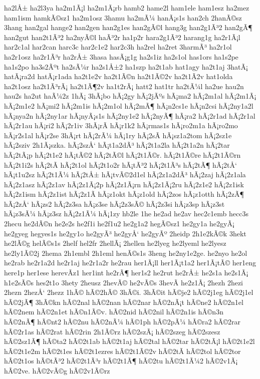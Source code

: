 {ha2lÅ±
ha2l3ya
ha2m1Ã¡l
ha2m1Ã¡rb
hamb2
hame2l
ham1ele
ham1esz
ha2mez
ham1ism
hamkÃ©sz1
ha2m1osz
3hamu
ha2mÃ¼
hanÃ¡s1s
han2ch
2hanÃ©sz
3hang
han2gal
hange2
han2gen
han2g1es
han2gÃ©l
hang3g
han2g1Ã³2
han2gÃ¶
han2gut
han2t1Ã³2
ha2nyÃ©l
haÃ³2r
ha1p2r
hara2g1Ã³2
harang1g
ha2r1Ã¡l
har2c1al
har2can
harc3c
har2c1e2
har2c3h
ha2rel
ha2ret
3harmÃ³
ha2r1ol
ha2r1osz
ha2r1Ã³r
ha2rÅ±
3hasa
hasÃ¡g1g
ha2s1iz
ha2s1ol
has1ors
ha1s2pe
ha1s2po
ha3s2Ãºt
ha2sÃ¼r
ha2s1Å±2
ha1szp
ha2t1ab
hat1agy
ha2t1aj
3hatÃ¡
hatÃ¡ra2d
hatÃ¡r1ada
ha2t1e2v
ha2t1Ã©n
ha2t1Ã©2v
ha2t1Ã­2v
hat1olda
ha2t1osz
ha2t1Ã³rÃ¡
ha2t1Ã¶2v
ha1t2rÃ¡
hatt2
hat1tr
ha2tÃ¼l
ha2ue
hau2n
hau2s
ha2ut
haÃ¼2z
1hÃ¡
3hÃ¡bo
hÃ¡2gy
hÃ¡2jÃºs
hÃ¡ma2
hÃ¡2m1al
hÃ¡2m1Ã¡
hÃ¡2m1e2
hÃ¡mi2
hÃ¡2m1is
hÃ¡2m1ol
hÃ¡2mÃ¶
hÃ¡n2cs1e
hÃ¡n2csi
hÃ¡2ny1a2l
hÃ¡nya2n
hÃ¡2ny1ar
hÃ¡nyÃ¡s1s
hÃ¡2ny1e2
hÃ¡2nyÃ¶
hÃ¡ra2
hÃ¡2r1ad
hÃ¡2r1al
hÃ¡2r1au
hÃ¡ri2
hÃ¡2r1iv
3hÃ¡rÃ­
hÃ¡r1k2
hÃ¡rmas1s
hÃ¡ro2m1a
hÃ¡ro2mo
hÃ¡r2s1al
hÃ¡r2se
3hÃ¡rt
hÃ¡2rÃ¼
hÃ¡1ry
hÃ¡2sÃ­
hÃ¡sz1a2tom
hÃ¡2sz1e
hÃ¡2sziv
2h1Ã¡szka.
hÃ¡2szÅ‘
hÃ¡t1a2dÃ³
hÃ¡2t1a2la
hÃ¡2t1a2n
hÃ¡2tar
hÃ¡2tÃ¡p
hÃ¡2t1e2
hÃ¡tÃ©2
hÃ¡2tÃ©l
hÃ¡2t1Ã©r.
hÃ¡2t1Ã©re
hÃ¡2t1Ã©rn
hÃ¡2t1i2s
hÃ¡2tÃ­
hÃ¡2t1ol
hÃ¡2t1o2r
hÃ¡tÃ³2
hÃ¡2t1Ã³s
hÃ¡2tÃ¶
hÃ¡2tÅ‘
hÃ¡t1u2sz
hÃ¡2t1Ã¼
hÃ¡2tÅ±
hÃ¡tvÃ©2d1el
hÃ¡2z1a2dÃ³
hÃ¡2zaj
hÃ¡2z1ala
hÃ¡2z1asz
hÃ¡2z1av
hÃ¡2z1Ã¡2p
hÃ¡2z1Ã¡rn
hÃ¡2z1Ã¡2ru
hÃ¡2z1e2
hÃ¡2z1isk
hÃ¡2z1ism
hÃ¡2z1ist
hÃ¡2z1Ã­
hÃ¡z1okt
hÃ¡z1old
hÃ¡2zos
hÃ¡z1otth
hÃ¡2zÃ¶
hÃ¡2zÅ‘
hÃ¡zs2
hÃ¡2z3sa
hÃ¡z3se
hÃ¡2z3sÃ©
hÃ¡2z3si
hÃ¡z3sp
hÃ¡z3st
hÃ¡z3sÃ¼
hÃ¡z3sz
hÃ¡2z1Ã¼
hÃ¡1zy
hb2le
1he
he2ad
he2av
hec2c1emb
hecc3s
2hecu
he2dÃ©n
he2e2s
he2f1i
he2f1u2
he2g1a2
hegÃ©sz1
he2gy1a
he2gyÃ¡
he2gyeg
hegyes1s
he2gy1o
he2gyÃ³
he2gyÅ‘
he2gyÃº
2heidp
2h1e2kÃ©k
3hekt
he2lÃ©g
helÃ©s1s
2helf
hel2fr
2hellÃ¡
2hellen
he2lyeg
he2lyeml
he2lyesz
he2ly1Ã©2j
2hema
2h1embl
2h1eml
henÃ©s1s
3heng
he2ny1e2ge.
he2nyo
he2ol
he2rab
he2r1a2d
he2r1aj
he2r1a2r
he2rau
her1Ã¡ll
her1Ã¡t1a2
her1Ã¡tÃ©
her1eng
here1p
her1ese
herevÃ­z1
her1int
he2rÃ¶
her1s2
he2rut
he2rÅ±
he2s1a
he2s1Ã¡
h1e2sÃ©s
hes2t1o
3hety
2heusz
2hevÃ©
he2vÃ©s
3hevÃ­
he2z1Ã¡
2hezh
2hezi
2hezn
2hezÅ‘
2hezz
1hÃ©
hÃ©2hÃ©
3hÃ©i.
3hÃ©it
hÃ©je2
hÃ©2j1eg
hÃ©2j1el
hÃ©2jÃ¶
3hÃ©kn
hÃ©2nal
hÃ©2nan
hÃ©2nar
hÃ©2nÃ¡t
hÃ©ne2
hÃ©2n1el
hÃ©2nem
hÃ©2n1et
hÃ©n1Ã©v.
hÃ©2nid
hÃ©2nil
hÃ©2n1is
hÃ©n3n
hÃ©2nÃ¶
hÃ©nt2
hÃ©2nu
hÃ©2nÃ¼
hÃ©1ph
hÃ©2pÃ¼
hÃ©ra2
hÃ©2rar
hÃ©2r1as
hÃ©2rat
hÃ©2rin
2h1Ã©rz
hÃ©2szÃ¡
hÃ©2szeg
hÃ©2szesz
hÃ©2sz1Ã¶
hÃ©ta2
hÃ©2t1ab
hÃ©2t1aj
hÃ©2tal
hÃ©2tar
hÃ©2tÃ¡l
hÃ©2t1e2l
hÃ©2t1e2m
hÃ©2t1es
hÃ©2t1ezres
hÃ©2t1Ã©2v
hÃ©2tÃ­
hÃ©2tol
hÃ©2tor
hÃ©2t1os
hÃ©tÃ³2
hÃ©2t1Ã³r
hÃ©2t1Ã¶
hÃ©2tu
hÃ©2t1Ã¼2
hÃ©2v1Ã¡
hÃ©2ve.
hÃ©2vÃ©g
hÃ©2v1Ã©rz
}
